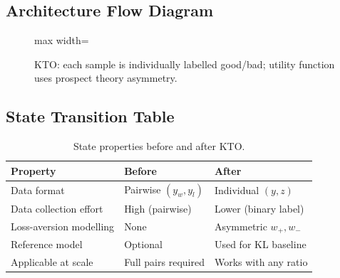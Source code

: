 \documentclass{article}
\begin{document}
\subsection{Architecture Flow Diagram}

\begin{figure}[h]
\centering
\begin{adjustbox}{max width=\linewidth}
\end{adjustbox}
\caption{KTO: each sample is individually labelled good/bad; utility function uses prospect theory asymmetry.}
\end{figure}

\subsection{State Transition Table}
\begin{table}[h]\centering
\begin{tabular}{lll}\toprule
\textbf{Property} & \textbf{Before} & \textbf{After}\\\midrule
Data format & Pairwise $(y_w, y_l)$ & Individual $(y, z)$\\
Data collection effort & High (pairwise) & Lower (binary label)\\
Loss-aversion modelling & None & Asymmetric $w_+, w_-$\\
Reference model & Optional & Used for KL baseline\\
Applicable at scale & Full pairs required & Works with any ratio\\\bottomrule
\end{tabular}
\caption{State properties before and after KTO.}
\end{table}
\end{document}
